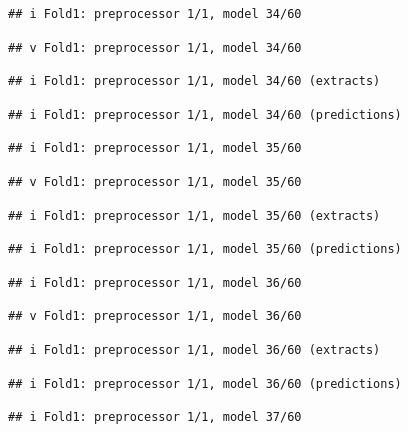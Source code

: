 \documentclass[
]{article}
\begin{document}
\begin{verbatim}
## i Fold1: preprocessor 1/1, model 34/60
\end{verbatim}

\begin{verbatim}
## v Fold1: preprocessor 1/1, model 34/60
\end{verbatim}

\begin{verbatim}
## i Fold1: preprocessor 1/1, model 34/60 (extracts)
\end{verbatim}

\begin{verbatim}
## i Fold1: preprocessor 1/1, model 34/60 (predictions)
\end{verbatim}

\begin{verbatim}
## i Fold1: preprocessor 1/1, model 35/60
\end{verbatim}

\begin{verbatim}
## v Fold1: preprocessor 1/1, model 35/60
\end{verbatim}

\begin{verbatim}
## i Fold1: preprocessor 1/1, model 35/60 (extracts)
\end{verbatim}

\begin{verbatim}
## i Fold1: preprocessor 1/1, model 35/60 (predictions)
\end{verbatim}

\begin{verbatim}
## i Fold1: preprocessor 1/1, model 36/60
\end{verbatim}

\begin{verbatim}
## v Fold1: preprocessor 1/1, model 36/60
\end{verbatim}

\begin{verbatim}
## i Fold1: preprocessor 1/1, model 36/60 (extracts)
\end{verbatim}

\begin{verbatim}
## i Fold1: preprocessor 1/1, model 36/60 (predictions)
\end{verbatim}

\begin{verbatim}
## i Fold1: preprocessor 1/1, model 37/60
\end{verbatim}
\end{document}
